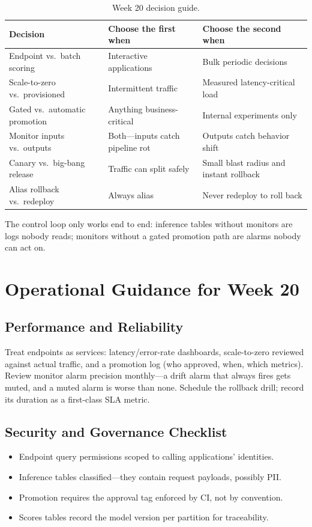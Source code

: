 \begin{table}[H]
\centering
\small
\begin{tabular}{@{}p{3.4cm}p{4.4cm}p{4.6cm}@{}}
\toprule
\textbf{Decision} & \textbf{Choose the first when} & \textbf{Choose the second when} \\
\midrule
Endpoint vs.\ batch scoring & Interactive applications & Bulk periodic decisions \\
Scale-to-zero vs.\ provisioned & Intermittent traffic & Measured latency-critical load \\
Gated vs.\ automatic promotion & Anything business-critical & Internal experiments only \\
Monitor inputs vs.\ outputs & Both---inputs catch pipeline rot & Outputs catch behavior shift \\
Canary vs.\ big-bang release & Traffic can split safely & Small blast radius and instant rollback \\
Alias rollback vs.\ redeploy & Always alias & Never redeploy to roll back \\
\bottomrule
\end{tabular}
\caption{Week 20 decision guide.}
\label{tab:ch20-decisions}
\end{table}

The control loop only works end to end: inference tables without monitors are logs nobody reads; monitors without a gated promotion path are alarms nobody can act on.

\section{Operational Guidance for Week 20}
%
\subsection{Performance and Reliability}
Treat endpoints as services: latency/error-rate dashboards, scale-to-zero reviewed against actual traffic, and a promotion log (who approved, when, which metrics). Review monitor alarm precision monthly---a drift alarm that always fires gets muted, and a muted alarm is worse than none. Schedule the rollback drill; record its duration as a first-class SLA metric.

\subsection{Security and Governance Checklist}
\begin{itemize}
    \item Endpoint query permissions scoped to calling applications' identities.
    \item Inference tables classified---they contain request payloads, possibly PII.
    \item Promotion requires the approval tag enforced by CI, not by convention.
    \item Scores tables record the model version per partition for traceability.
\end{itemize}


